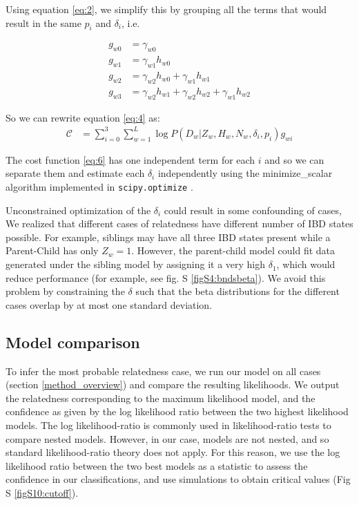 \documentclass[12pt, letterpaper]{article}
\begin{document}
Using equation \ref{eq:2}, we simplify this by grouping all the terms that would result in the same $p_i$ and $\delta_i$, i.e.

\begin{align*}\label{eq:5}
g_{w0} &= \gamma_{w0}\\
g_{w1} &= \gamma_{w1} h_{w0}\\
g_{w2} &= \gamma_{w2} h_{w0} + \gamma_{w1} h_{w1}\\
g_{w3} &= \gamma_{w2} h_{w1} + \gamma_{w2} h_{w2} + \gamma_{w1} h_{w2}
\end{align*}

So we can rewrite equation \ref{eq:4} as:
\begin{align}\label{eq:6}
\mathcal{C} &= \sum_{i=0}^3 \sum_{w=1}^L \log P(D_{w}|Z_w, H_w, N_w, \delta_i, p_i)g_{wi}
\end{align}

The cost function \ref{eq:6} has one independent term for each $i$ and so we can separate them and estimate each $\delta_i$ independently using the minimize\_scalar algorithm implemented in \texttt{scipy.optimize} \cite{virtanen_scipy_2020}. 


Unconstrained optimization of the $\delta_i$ could result in some confounding of cases, We realized that different cases of relatedness have different number of IBD states possible. For example, siblings may have all three IBD states present while a Parent-Child has only $Z_w=1$. However, the parent-child model could fit data generated under the sibling model by assigning it a very high $\delta_1$, which would reduce performance  (for example, see fig. S \ref{figS4:bndsbeta}). We avoid this problem by constraining the $\delta$ such that the beta distributions for the different cases overlap by at most one standard deviation.

\subsection{Model comparison}\label{model_comp}
To infer the most probable relatedness case, we run our model on all cases (section \ref{method_overview}) and compare the resulting likelihoods. We output the relatedness corresponding to the maximum likelihood model, and the confidence as given by the log likelihood ratio between the two highest likelihood models. The log likelihood-ratio is commonly used in likelihood-ratio tests to compare nested models. However, in our case, models are not nested, and so standard likelihood-ratio theory does not apply. For this reason, we use the log likelihood ratio between the two best models as a statistic to assess the confidence in our classifications, and use simulations to obtain critical values (Fig S \ref{figS10:cutoff}). 
\end{document}
